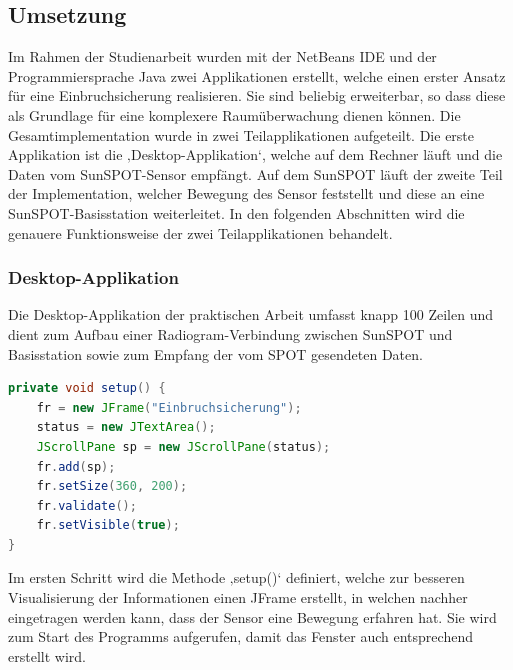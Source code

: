 \subsection{Umsetzung}\label{s:Umsetzung}

Im Rahmen der Studienarbeit wurden mit der NetBeans IDE und der Programmiersprache Java zwei Applikationen erstellt, welche einen erster Ansatz für eine Einbruchsicherung realisieren. Sie sind beliebig erweiterbar, so dass diese als Grundlage für eine komplexere Raumüberwachung dienen können. Die Gesamtimplementation wurde in zwei Teilapplikationen aufgeteilt. Die erste Applikation ist die ‚Desktop-Applikation‘, welche auf dem Rechner läuft und die Daten vom SunSPOT-Sensor empfängt. Auf dem SunSPOT läuft der zweite Teil der Implementation, welcher Bewegung des Sensor feststellt und diese an eine SunSPOT-Basisstation weiterleitet. In den folgenden Abschnitten wird die genauere Funktionsweise der zwei Teilapplikationen behandelt.

\subsubsection{Desktop-Applikation}\label{sss:Desktop-Applikation}

Die Desktop-Applikation der praktischen Arbeit umfasst knapp 100 Zeilen und dient zum Aufbau einer Radiogram-Verbindung zwischen SunSPOT und Basisstation sowie zum Empfang der vom SPOT gesendeten Daten. 

\begin{lstlisting}[language=Java,caption={Ausschnitt aus der setup()-Methode},label=lst:setup,frame=single] 
private void setup() {
	fr = new JFrame("Einbruchsicherung");
	status = new JTextArea();
	JScrollPane sp = new JScrollPane(status);
	fr.add(sp);
	fr.setSize(360, 200);
	fr.validate();
	fr.setVisible(true);
}           
\end{lstlisting}

Im ersten Schritt wird die Methode ‚setup()‘ definiert, welche zur besseren Visualisierung der Informationen einen JFrame erstellt, in welchen nachher eingetragen werden kann, dass der Sensor eine Bewegung erfahren hat. Sie wird zum Start des Programms aufgerufen, damit das Fenster auch entsprechend erstellt wird. \\

